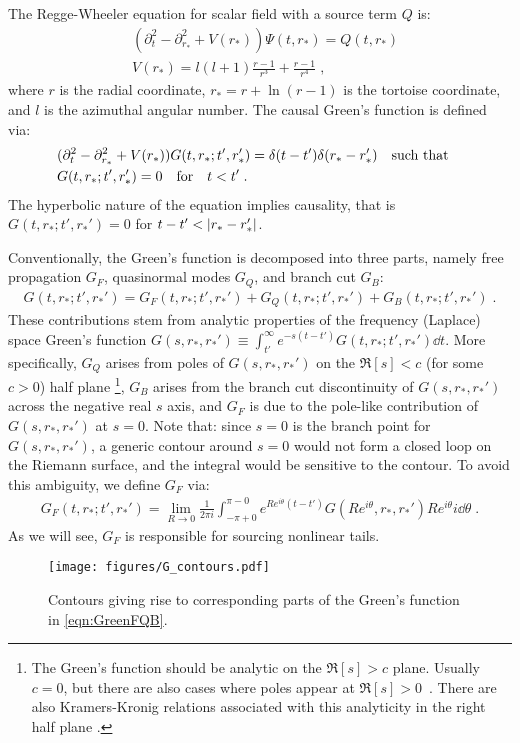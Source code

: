 \documentclass[reprint,aps,physrev,superscriptaddress,10pt,notitlepage,prd,nofootinbib,onecolumn]{revtex4-2}
\begin{document}
The Regge-Wheeler equation for scalar field with a source term $Q$ is:
\begin{align}
  \label{eq:rw_equation_with_source}
  & (\partial_t^2 - \partial_{r_*}^2 +V(r_*)) \Psi(t,r_*) =  Q(t,r_*) \nonumber \\
  & V(r_*) = l (l+1) \frac{r-1}{r^3} + \frac{r-1}{r^4} \;,
\end{align}
where $r$ is the radial coordinate, $r_* = r + \ln(r - 1)$ is the tortoise coordinate, and $l$ is the azimuthal angular number.
The causal Green's function is defined via:
\begin{align}
  \label{eq:green_function_definition}
  & (\partial_t^2 - \partial_{r_*}^2 + V(r_*)) G(t,r_*;t',r_*') =  \delta(t-t') \delta(r_*-r_*') \qq{such that} \nonumber \\
  & G(t,r_*;t',r_*') = 0 \qq{for} t < t' \;.
\end{align}
The hyperbolic nature of the equation implies causality, that is $G(t,r_*;t',r_*')=0$ for $t-t' < \abs{r_*-r_*'}$.


Conventionally, the Green's function is decomposed into three parts, namely free propagation $G_F$, quasinormal modes $G_Q$, and branch cut $G_B$:
\begin{align} \label{eqn:GreenFQB}
  G(t,r_*;t',r_*') = G_F(t,r_*;t',r_*') + G_Q(t,r_*;t',r_*') + G_B(t,r_*;t',r_*') \;.
\end{align}
These contributions stem from analytic properties of the frequency (Laplace) space Green's function $G(s,r_*,r_*') \equiv \int_{t'}^\infty e^{-s(t-t')} G(t,r_*;t',r_*') \dd{t}$.
More specifically, $G_Q$ arises from poles of $G(s,r_*,r_*')$ on the $\Re[s] < c$ (for some $c >0$) half plane \footnote{The Green's function should be analytic on the $\Re[s] > c$ plane. Usually $c=0$, but there are also cases where poles appear at $\Re[s]>0$~\cite{Hui:2019aox}. There are also Kramers-Kronig relations associated with this analyticity in the right half plane \cite{DeLuca:2024ufn}.}, $G_B$ arises from the branch cut discontinuity of $G(s,r_*,r_*')$ across the negative real $s$ axis, and $G_F$ is due to the pole-like contribution of $G(s,r_*,r_*')$ at $s=0$. 
Note that: since $s=0$ is the branch point for $G(s,r_*,r_*')$, a generic contour around $s=0$ would not form a closed loop on the Riemann surface, and the integral would be sensitive to the contour.
To avoid this ambiguity, we define $G_F$ via:
\begin{align}
  G_F(t,r_*;t',r_*') = \lim_{R \to 0} \frac{1}{2\pi i} \int_{-\pi+0}^{\pi-0} e^{R e^{i\theta} (t-t')} G(R e^{i\theta},r_*,r_*') R e^{i\theta} i \dd{\theta} \;.
\end{align}
As we will see, $G_F$ is responsible for sourcing nonlinear tails.
\begin{figure}
    \centering
    \texttt{[image: figures/G\_contours.pdf]}
    \caption{Contours giving rise to corresponding parts of the Green's function in \eqref{eqn:GreenFQB}.}
    \label{fig:Gcontours}
\end{figure}
\end{document}
